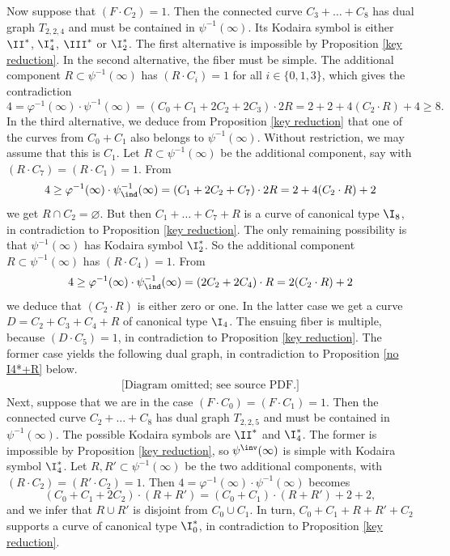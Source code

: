 Now suppose that $(F\cdot C_2)=1$. Then the connected curve $C_3+\ldots + C_8$ has dual graph $T_{2,2,4}$
and must be contained in $\psi^{-1}(\infty)$. Its Kodaira symbol is either $\II^*$, $\I_4^*$, $\III^*$ or $\I_2^*$.
The first alternative  is impossible by Proposition \ref{key reduction}.
In the second alternative, the fiber must be simple.
The additional component $R\subset\psi^{-1}(\infty)$ has $(R\cdot C_i)=1$ for all $i\in\{0,1,3\}$,
which gives the contradiction
$$
4=\varphi^{-1}(\infty)\cdot\psi^{-1}(\infty) = (C_0+C_1+2C_2+2C_3)\cdot 2R= 2+2+4(C_2\cdot R) + 4\geq 8.
$$
In the third  alternative, we deduce
from Proposition \ref{key reduction} that one of the curves from $C_0+C_1$ also belongs to $\psi^{-1}(\infty)$.
Without restriction, we may assume that this is $C_1$. Let $R\subset\psi^{-1}(\infty)$ be the additional component,
say with  $(R\cdot C_7)=(R\cdot C_1)=1$. From
$$
4\geq \varphi^{-1}(\infty)\cdot\psi^{-1}_\ind(\infty) = (C_1+2C_2+C_7)\cdot 2R = 2+ 4(C_2\cdot R) + 2
$$
we get $R\cap  C_2=\varnothing$. But then $C_1+\ldots+C_7+R$ is a curve of canonical type $\I_8$, in contradiction
to Proposition \ref{key reduction}.
The only remaining possibility is that  $\psi^{-1}(\infty) $ has Kodaira symbol $\I_2^*$.
So the additional component $R\subset\psi^{-1}(\infty)$ has $(R\cdot C_4)=1$. From
$$
4\geq \varphi^{-1}(\infty)\cdot\psi^{-1}_\ind(\infty) = (2C_2+2C_4)\cdot R=   2(C_2\cdot R) + 2
$$
we deduce that $(C_2\cdot R)$ is either zero or one.
In the latter case we get a curve $D=C_2+C_3+C_4+R$ of canonical type $\I_4$.
The ensuing fiber is multiple, because $(D\cdot C_5)=1$, in contradiction to Proposition \ref{key reduction}.
The former case yields the following dual graph, in contradiction to  Proposition \ref{no I4*+R} below.
\begin{equation*}
\begin{gathered}
\text{[Diagram omitted; see source PDF.]}
\end{gathered}
\end{equation*}
Next, suppose that we are in the case $(F\cdot C_0)=(F\cdot C_1)=1$. Then the connected curve $C_2+\ldots+C_8$
has dual graph $T_{2,2,5}$  and must be contained in $\psi^{-1}(\infty)$.
The possible Kodaira symbols are $\II^*$ and $\I_4^*$.
The former is impossible by Proposition \ref{key reduction}, so $\psi^\inv(\infty)$ is simple with Kodaira symbol $\I_4^*$.
Let $R,R'\subset\psi^{-1}(\infty)$ be the two additional components,
with $(R\cdot C_2)=(R'\cdot C_2)=1$. Then $4=\varphi^{-1}(\infty)\cdot \psi^{-1}(\infty)$ becomes
$$
(C_0+C_1+2C_2)\cdot (R+R') = (C_0+C_1)\cdot (R+R') + 2+2,
$$
and we infer that $R\cup R'$ is disjoint from $C_0\cup C_1$. In turn, $C_0+C_1+R+R'+C_2$ supports a curve of canonical type
$\I_0^*$, in  contradiction to Proposition \ref{key reduction}.

